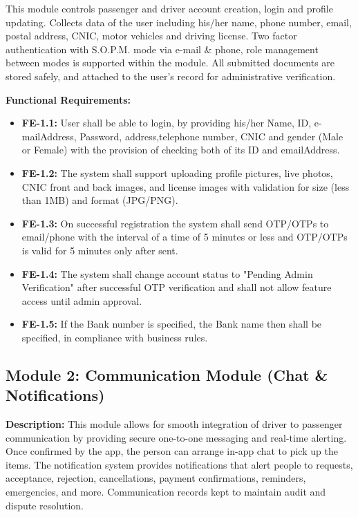 This module controls passenger and driver account creation, login and profile updating. Collects data of the user including his/her name, phone number, email, postal address, CNIC, motor vehicles and driving license. Two factor authentication with S.O.P.M. mode via e-mail \& phone, role management between modes is supported within the module. All submitted documents are stored safely, and attached to the user's record for administrative verification.

\textbf{Functional Requirements:}

\begin{itemize}
    \item \textbf{FE-1.1:} User shall be able to login, by providing his/her Name, ID, e-mailAddress, Password, address,telephone number, CNIC and gender (Male or Female) with the provision of checking both of its ID and emailAddress.

    \item \textbf{FE-1.2:} The system shall support uploading profile pictures, live photos, CNIC front and back images, and license images with validation for size (less than 1MB) and format (JPG/PNG).

    \item \textbf{FE-1.3:} On successful registration the system shall send OTP/OTPs to email/phone with the interval of a time of 5 minutes or less and OTP/OTPs is valid for 5 minutes only after sent.

    \item \textbf{FE-1.4:} The system shall change account status to "Pending Admin Verification" after successful OTP verification and shall not allow feature access until admin approval.

    \item \textbf{FE-1.5:} If the Bank number is specified, the Bank name then shall be specified, in compliance with business rules.
\end{itemize}

\subsection{Module 2: Communication Module (Chat \& Notifications)}

\textbf{Description:} This module allows for smooth integration of driver to passenger communication by providing secure one-to-one messaging and real-time alerting. Once confirmed by the app, the person can arrange in-app chat to pick up the items. The notification system provides notifications that alert people to requests, acceptance, rejection, cancellations, payment confirmations, reminders, emergencies, and more. Communication records kept to maintain audit and dispute resolution.

